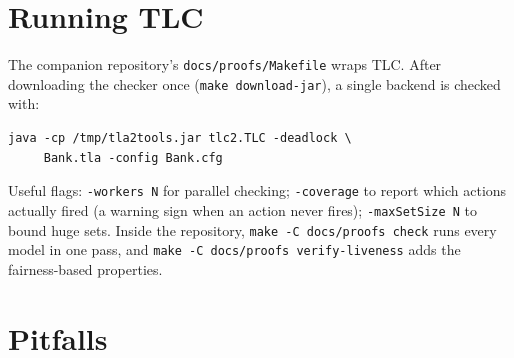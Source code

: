 \section{Running TLC}

The companion repository's \texttt{docs/proofs/Makefile} wraps TLC.  After
downloading the checker once (\texttt{make download-jar}), a single backend
is checked with:

\begin{verbatim}
java -cp /tmp/tla2tools.jar tlc2.TLC -deadlock \
     Bank.tla -config Bank.cfg
\end{verbatim}

Useful flags: \texttt{-workers N} for parallel checking;
\texttt{-coverage} to report which actions actually fired (a warning sign
when an action never fires); \texttt{-maxSetSize N} to bound huge sets.
Inside the repository, \texttt{make -C docs/proofs check} runs every model
in one pass, and \texttt{make -C docs/proofs verify-liveness} adds the
fairness-based properties.

\section{Pitfalls}


